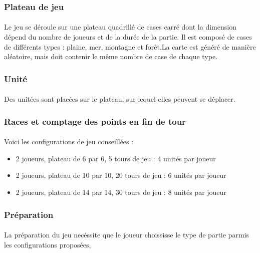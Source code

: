 \documentclass[a4paper]{article}
\begin{document}
\subsubsection{Plateau de jeu}
\paragraph{}
Le jeu se déroule sur une plateau quadrillé de cases carré dont la dimension dépend du nombre de joueurs et de la durée de la partie.\label{map_gen} Il est composé de cases de différents types : plaine, mer, montagne et forêt.La carte est généré de manière aléatoire, mais doit contenir le même nombre de case de chaque type.

\subsubsection{Unité}
\paragraph{}
Des unitées sont placées sur le plateau, sur lequel elles peuvent se déplacer.

\subsubsection{Races et comptage des points en fin de tour}

\paragraph{}
Voici les configurations de jeu conseillées :
\begin{itemize}
    \item 2 joueurs, plateau de 6 par 6, 5 tours de jeu : 4 unités par joueur
    \item 2 joueurs, plateau de 10 par 10, 20 tours de jeu : 6 unités par joueur
    \item 2 joueurs, plateau de 14 par 14, 30 tours de jeu : 8 unités par joueur
\end{itemize}

\subsubsection{Préparation}
\paragraph{}
La préparation du jeu necéssite que le joueur choississe le type de partie parmis les configurations proposées, 
\end{document}

